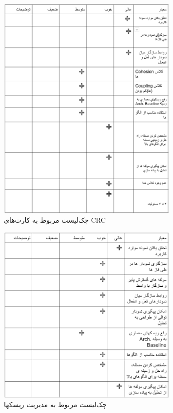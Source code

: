 \begin{figure}[H]
    \centering
    \includegraphics[width = 0.8\textwidth]{files/figures/checklists/crc.png}
    \caption{چک‌لیست مربوط به کارت‌های CRC}
    \label{fig:crccl}
\end{figure}

\begin{figure}[H]
    \centering
    \includegraphics[width = 0.8\textwidth]{files/figures/checklists/riskManagement.png}
    \caption{چک‌لیست مربوط به مديريت ريسكها}
    \label{fig:rmcl}
\end{figure}

